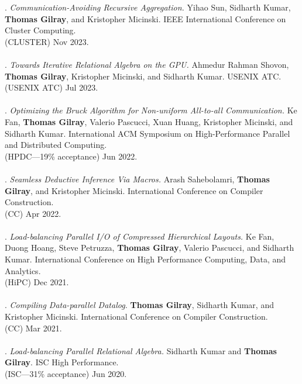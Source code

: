 \paper. \textit{Communication-Avoiding Recursive Aggregation.}
Yihao Sun, Sidharth Kumar, \textbf{Thomas Gilray}, and Kristopher Micinski.
IEEE International Conference on Cluster Computing.
\\(CLUSTER) Nov 2023. 
\\ \vspace{-0.1cm}\\
\paper. \textit{Towards Iterative Relational Algebra on the GPU.}
Ahmedur Rahman Shovon, \textbf{Thomas Gilray}, Kristopher Micinski, and Sidharth Kumar.
USENIX ATC.
\\(USENIX ATC) Jul 2023. 
\\ \vspace{-0.1cm}\\
\paper. \textit{Optimizing the Bruck Algorithm for Non-uniform All-to-all Communication.}
Ke Fan, \textbf{Thomas Gilray}, Valerio Pascucci, Xuan Huang, Kristopher Micinski, and Sidharth Kumar.
International ACM Symposium on High-Performance Parallel and Distributed Computing.
\\(HPDC---19\% acceptance) Jun 2022. 
\\ \vspace{-0.1cm}\\
\paper. \textit{Seamless Deductive Inference Via Macros.}
Arash Sahebolamri, \textbf{Thomas Gilray}, and Kristopher Micinski.
International Conference on Compiler Construction.
\\(CC) Apr 2022. 
\\ \vspace{-0.1cm}\\
\paper. \textit{Load-balancing Parallel I/O of Compressed Hierarchical Layouts.}
Ke Fan, Duong Hoang, Steve Petruzza, \textbf{Thomas Gilray}, Valerio Pascucci, and Sidharth Kumar.
International Conference on High Performance Computing, Data, and Analytics.
\\(HiPC) Dec 2021. 
\\ \vspace{-0.1cm}\\
\paper. \textit{Compiling Data-parallel Datalog.}
\textbf{Thomas Gilray}, Sidharth Kumar, and Kristopher Micinski.
International Conference on Compiler Construction.
\\(CC) Mar 2021. 
\\ \vspace{-0.1cm}\\
\paper. \textit{Load-balancing Parallel Relational Algebra.}
Sidharth Kumar and \textbf{Thomas Gilray}.
ISC High Performance.
\\(ISC---31\% acceptance) Jun 2020. 
